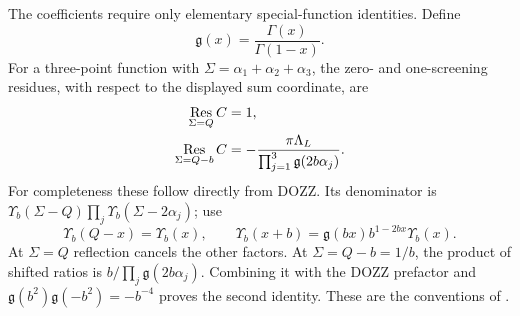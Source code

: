 \documentclass[11pt,a4paper]{article}
\numberwithin{equation}{section}
\theoremstyle{definition}
\theoremstyle{remark}
\begin{document}
The coefficients require only elementary special-function
identities. Define
\begin{equation}
 \mathfrak g(x)=\frac{\Gamma(x)}{\Gamma(1-x)}.
 \label{eq:gammaratio}
\end{equation}
For a three-point function with $\Sigma=\alpha_1+\alpha_2+\alpha_3$,
the zero- and one-screening residues, with respect to the
displayed sum coordinate, are
\begin{align}
 \operatorname*{Res}_{\Sigma=Q}C&=1,\notag\\
 \operatorname*{Res}_{\Sigma=Q-b}C
  &=-\frac{\pi\Lambda_L}
       {\prod_{j=1}^3\mathfrak g(2b\alpha_j)}.
 \label{eq:threepointscreeningresidues}
\end{align}
For completeness these follow directly from DOZZ. Its denominator
is $\Upsilon_b(\Sigma-Q)\prod_j\Upsilon_b(\Sigma-2\alpha_j)$;
use
\[
 \Upsilon_b(Q-x)=\Upsilon_b(x),\qquad
 \Upsilon_b(x+b)=\mathfrak g(bx)b^{1-2bx}\Upsilon_b(x).
\]
At $\Sigma=Q$ reflection cancels the other factors. At
$\Sigma=Q-b=1/b$, the product of shifted ratios is
$b/\prod_j\mathfrak g(2b\alpha_j)$. Combining it with the
DOZZ prefactor and
$\mathfrak g(b^2)\mathfrak g(-b^2)=-b^{-4}$ proves the
second identity. These are the conventions of
\cite[eqs.~(9), (11), (13)]{TeschnerRevisited}.
\end{document}
